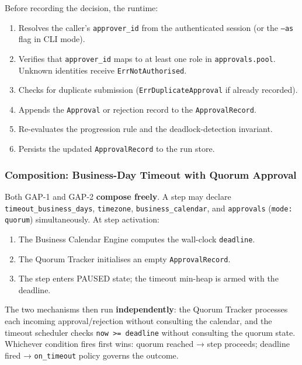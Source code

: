 Before recording the decision, the runtime:
\begin{enumerate}
  \item Resolves the caller's \texttt{approver\_id} from the authenticated session (or
        the \texttt{--as} flag in CLI mode).
  \item Verifies that \texttt{approver\_id} maps to at least one role in
        \texttt{approvals.pool}. Unknown identities receive \texttt{ErrNotAuthorised}.
  \item Checks for duplicate submission (\texttt{ErrDuplicateApproval} if already recorded).
  \item Appends the \texttt{Approval} or rejection record to the \texttt{ApprovalRecord}.
  \item Re-evaluates the progression rule and the deadlock-detection invariant.
  \item Persists the updated \texttt{ApprovalRecord} to the run store.
\end{enumerate}

\subsubsection*{Composition: Business-Day Timeout with Quorum Approval}

Both GAP-1 and GAP-2 \textbf{compose freely}. A step may declare
\texttt{timeout\_business\_days}, \texttt{timezone}, \texttt{business\_calendar}, and
\texttt{approvals} (\texttt{mode: quorum}) simultaneously. At step activation:

\begin{enumerate}
  \item The Business Calendar Engine computes the wall-clock \texttt{deadline}.
  \item The Quorum Tracker initialises an empty \texttt{ApprovalRecord}.
  \item The step enters PAUSED state; the timeout min-heap is armed with the deadline.
\end{enumerate}

The two mechanisms then run \textbf{independently}: the Quorum Tracker processes each
incoming approval/rejection without consulting the calendar, and the timeout scheduler
checks \texttt{now >= deadline} without consulting the quorum state. Whichever condition
fires first wins: quorum reached → step proceeds; deadline fired → \texttt{on\_timeout}
policy governs the outcome.

